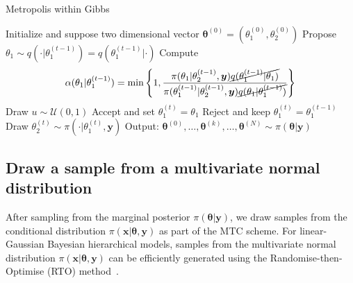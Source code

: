 \begin{algorithm}[!ht]
	\caption{Metropolis within Gibbs}
	\begin{algorithmic}[1]
		\STATE Initialize and suppose two dimensional vector \( \bm{\theta}^{(0)}  =( \theta_1^{(0)} , \theta_2^{(0)}  ) \)
		\STATE Propose \( \theta_1 \sim q(\cdot   | \theta_1 ^{(t-1)}) = q(\theta_1 ^{(t-1)} |\cdot  ) \)
		\STATE Compute
		\[ \alpha( \theta_1  | \theta_1^{(t-1)}) = \min \left\{ 1, \frac{\pi(\theta_1  | \theta^{(t-1)}_2, \bm{y}) \cancel{q(\theta_1^{(t-1)} | \theta_1 ) } }{\pi(\theta_1^{(t-1)}| \theta_2^{(t-1)}, \bm{y}) \cancel{q(\theta_1 | \theta_1^{(t-1)})} } \right\} \]
		\STATE Draw $u \sim \mathcal{U}(0,1)$
		\STATE Accept and set \( \theta_1^{(t)} = \theta_1 \)
		\ELSE  
		\STATE Reject and keep \(\theta_1^{(t)} = \theta_1^{(t-1)} \)
		\ENDIF
		\STATE Draw \(\theta_2^{(t)} \sim  \pi( \cdot | \theta_1^{(t)} , \bm{y} )\) 
		\ENDFOR
		\STATE Output: $ \bm{\theta}^{(0)}, \dots,  \bm{\theta}^{(k)} , \dots,   \bm{\theta}^{(N)} \sim \pi(\bm{\theta}| \bm{y}) $
	\end{algorithmic}
\end{algorithm}


\subsection{Draw a sample from a multivariate normal distribution \label{subsec:RTO}}

After sampling from the marginal posterior $\pi(\bm{\theta} |  \bm{y})$, we draw samples from the conditional distribution $\pi(\bm{x} |  \bm{\theta}, \bm{y})$ as part of the MTC scheme. For linear-Gaussian Bayesian hierarchical models, samples from the multivariate normal distribution $\pi(\bm{x} |  \bm{\theta}, \bm{y})$ can be efficiently generated using the Randomise-then-Optimise (RTO) method~\cite{bardsley2012mcmc}.

